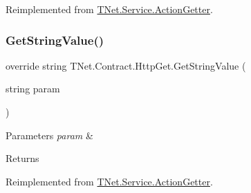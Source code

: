 Reimplemented from \mbox{\hyperlink{class_t_net_1_1_service_1_1_action_getter_acf7a917329a995f0ae9ba3977db3cbf0}{T\+Net.\+Service.\+Action\+Getter}}.

\mbox{\label{class_t_net_1_1_contract_1_1_http_get_a3a699f22e9dc9e02263097ebb345097c}} 
\subsubsection{\texorpdfstring{Get\+String\+Value()}{GetStringValue()}\hspace{0.1cm}{\footnotesize\ttfamily [1/2]}}
{\footnotesize\ttfamily override string T\+Net.\+Contract.\+Http\+Get.\+Get\+String\+Value (\begin{DoxyParamCaption}\item[{string}]{param }\end{DoxyParamCaption})\hspace{0.3cm}{\ttfamily [virtual]}}






\begin{DoxyParams}{Parameters}
{\em param} & \\
\hline
\end{DoxyParams}
\begin{DoxyReturn}{Returns}

\end{DoxyReturn}


Reimplemented from \mbox{\hyperlink{class_t_net_1_1_service_1_1_action_getter_a35e4f3f9255c3fdb020839d30d8e7e22}{T\+Net.\+Service.\+Action\+Getter}}.

\mbox{\label{class_t_net_1_1_contract_1_1_http_get_a4c59458094b5b47c7753d78ab9844c8a}} 
